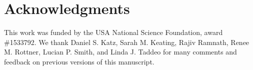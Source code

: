 \documentclass[review]{elsarticle}
\begin{document}
\section{Acknowledgments}

This work was funded by the USA National Science Foundation, award \#1533792.  We thank
Daniel S. Katz,
Sarah M. Keating,
Rajiv Ramnath,
Renee M. Rottner,
Lucian P. Smith, and
Linda J. Taddeo
for many comments and feedback on previous versions of this manuscript.




\end{document}
